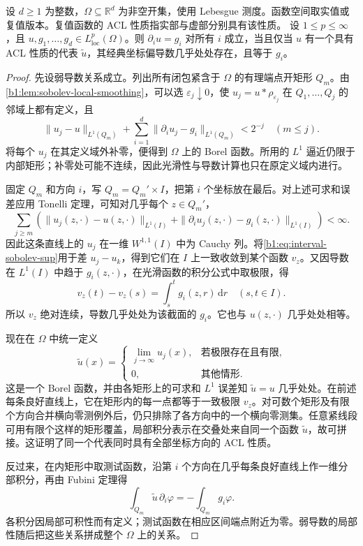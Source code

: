 \begin{theorem}\label{b1:thm:sobolev-acl}
设 \(d\geq1\) 为整数，\(\Omega\subseteq\mathbb R^d\) 为非空开集，使用 Lebesgue 测度。函数空间取实值或复值版本。复值函数的 ACL 性质指实部与虚部分别具有该性质。
设 \(1\leq p\leq\infty\)，且 \(u,g_1,\ldots,g_d\in L^p_{\mathrm{loc}}(\Omega)\)。则 \(\partial_i u=g_i\) 对所有 \(i\) 成立，当且仅当 \(u\) 有一个具有 ACL 性质的代表 \(\widetilde u\)，其经典坐标偏导数几乎处处存在，且等于 \(g_i\)。
\end{theorem}
\begin{proof}
先设弱导数关系成立。列出所有闭包紧含于 \(\Omega\) 的有理端点开矩形 \(Q_m\)。由\cref{b1:lem:sobolev-local-smoothing}，可以选 \(\varepsilon_j\downarrow0\)，使 \(u_j=u*\rho_{\varepsilon_j}\) 在 \(Q_1,\ldots,Q_j\) 的邻域上都有定义，且
\[
 \|u_j-u\|_{L^1(Q_m)}
 +\sum_{i=1}^d\|\partial_i u_j-g_i\|_{L^1(Q_m)}<2^{-j}
 \quad(m\leq j).
\]
将每个 \(u_j\) 在其定义域外补零，便得到 \(\Omega\) 上的 Borel 函数。所用的 \(L^1\) 逼近仍限于内部矩形；补零处可能不连续，因此光滑性与导数计算也只在原定义域内进行。

固定 \(Q_m\) 和方向 \(i\)，写 \(Q_m=Q_m'\times I\)，把第 \(i\) 个坐标放在最后。对上述可求和误差应用 Tonelli 定理，可知对几乎每个 \(z\in Q_m'\)，
\[
 \sum_{j\geq m}\left(
  \|u_j(z,\cdot)-u(z,\cdot)\|_{L^1(I)}
  +\|\partial_i u_j(z,\cdot)-g_i(z,\cdot)\|_{L^1(I)}
 \right)<\infty.
\]
因此这条直线上的 \(u_j\) 在一维 \(W^{1,1}(I)\) 中为 Cauchy 列。将\eqref{b1:eq:interval-sobolev-sup}用于差 \(u_j-u_k\)，得到它们在 \(I\) 上一致收敛到某个函数 \(v_z\)。又因导数在 \(L^1(I)\) 中趋于 \(g_i(z,\cdot)\)，在光滑函数的积分公式中取极限，得
\[
 v_z(t)-v_z(s)=\int_s^t g_i(z,r)\,\mathrm dr
 \quad(s,t\in I).
\]
所以 \(v_z\) 绝对连续，导数几乎处处为该截面的 \(g_i\)。它也与 \(u(z,\cdot)\) 几乎处处相等。

现在在 \(\Omega\) 中统一定义
\[
 \widetilde u(x)=
 \begin{cases}
  \displaystyle\lim_{j\to\infty}u_j(x),&\text{若极限存在且有限},\\
  0,&\text{其他情形}.
 \end{cases}
\]
这是一个 Borel 函数，并由各矩形上的可求和 \(L^1\) 误差知 \(\widetilde u=u\) 几乎处处。在前述每条良好直线上，它在矩形内的每一点都等于一致极限 \(v_z\)。对可数个矩形及有限个方向合并横向零测例外后，仍只排除了各方向中的一个横向零测集。任意紧线段可用有限个这样的矩形覆盖，局部积分表示在交叠处来自同一个函数 \(\widetilde u\)，故可拼接。这证明了同一个代表同时具有全部坐标方向的 ACL 性质。

反过来，在内矩形中取测试函数，沿第 \(i\) 个方向在几乎每条良好直线上作一维分部积分，再由 Fubini 定理得
\[
 \int_{Q_m}\widetilde u\,\partial_i\varphi
 =-\int_{Q_m}g_i\varphi.
\]
各积分因局部可积性而有定义；测试函数在相应区间端点附近为零。弱导数的局部性随后把这些关系拼成整个 \(\Omega\) 上的关系。
\end{proof}


